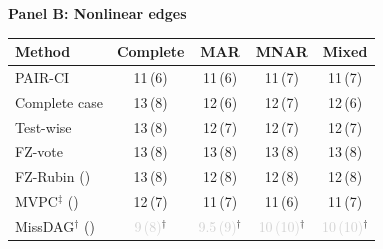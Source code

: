 \vspace{1em}
\textbf{Panel B: Nonlinear edges}\\[0.4em]
\begin{tabular}{lcccc}
    \toprule
    Method & Complete & MAR & MNAR & Mixed \\
    \midrule
    PAIR-CI                                           & 11\,{\scriptsize(6)} & 11\,{\scriptsize(6)} & 11\,{\scriptsize(7)} & 11\,{\scriptsize(7)} \\
    Complete case                                     & 13\,{\scriptsize(8)} & 12\,{\scriptsize(6)} & 12\,{\scriptsize(7)} & 12\,{\scriptsize(6)} \\
    Test-wise                                         & 13\,{\scriptsize(8)} & 12\,{\scriptsize(7)} & 12\,{\scriptsize(7)} & 12\,{\scriptsize(7)} \\
    FZ-vote                                           & 13\,{\scriptsize(8)} & 13\,{\scriptsize(8)} & 13\,{\scriptsize(8)} & 13\,{\scriptsize(8)} \\
    FZ-Rubin (\citeauthor{witte2022multiple})         & 13\,{\scriptsize(8)} & 12\,{\scriptsize(8)} & 12\,{\scriptsize(8)} & 12\,{\scriptsize(8)} \\
    MVPC$^\ddagger$ (\citeauthor{tu2019causal})       & 12\,{\scriptsize(7)} & 11\,{\scriptsize(7)} & 11\,{\scriptsize(6)} & 11\,{\scriptsize(7)} \\
    MissDAG$^\dagger$ (\citeauthor{gao2022missdag})   & \textcolor{lightgray}{9\,{\scriptsize(8)}}$^\dagger$ & \textcolor{lightgray}{9.5\,{\scriptsize(9)}}$^\dagger$ & \textcolor{lightgray}{10\,{\scriptsize(10)}}$^\dagger$ & \textcolor{lightgray}{10\,{\scriptsize(10)}}$^\dagger$ \\
    \bottomrule
\end{tabular}
